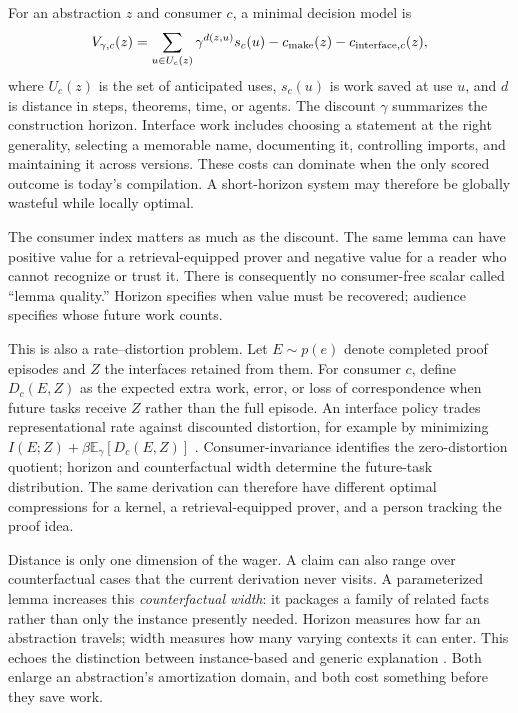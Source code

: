 \documentclass[10pt]{article}
\begin{document}
For an abstraction $z$ and consumer $c$, a minimal decision model is
\begin{equation}
 V_{\gamma,c}(z)=\sum_{u\in U_c(z)}\gamma^{d(z,u)}s_c(u)
 -c_{\rm make}(z)-c_{{\rm interface},c}(z),
 \label{eq:value}
\end{equation}
where $U_c(z)$ is the set of anticipated uses, $s_c(u)$ is work saved at use $u$, and $d$ is distance in
steps, theorems, time, or agents.  The discount $\gamma$ summarizes the construction horizon.
Interface work includes choosing a statement at the right generality, selecting a memorable name,
documenting it, controlling imports, and maintaining it across versions.  These costs can dominate
when the only scored outcome is today's compilation.  A short-horizon system may therefore be
globally wasteful while locally optimal.

The consumer index matters as much as the discount.  The same lemma can have positive value for a
retrieval-equipped prover and negative value for a reader who cannot recognize or trust it.  There
is consequently no consumer-free scalar called ``lemma quality.''  Horizon specifies when value
must be recovered; audience specifies whose future work counts.

This is also a rate--distortion problem.  Let $E\sim p(e)$ denote completed proof episodes and $Z$ the
interfaces retained from them.  For consumer $c$, define $D_c(E,Z)$ as the expected extra work,
error, or loss of correspondence when future tasks receive $Z$ rather than the full episode.  An
interface policy trades representational rate against discounted distortion, for example by
minimizing $I(E;Z)+\beta\mathbb{E}_{\gamma}[D_c(E,Z)]$ \citep{shannon1959}.  Consumer-invariance
identifies the zero-distortion quotient; horizon and counterfactual width determine the future-task
distribution.  The same derivation can therefore have different optimal compressions for a kernel,
a retrieval-equipped prover, and a person tracking the proof idea.

Distance is only one dimension of the wager.  A claim can also range over counterfactual cases that
the current derivation never visits.  A parameterized lemma increases this \emph{counterfactual
width}: it packages a family of related facts rather than only the instance presently needed.
Horizon measures how far an abstraction travels; width measures how many varying contexts it can
enter.  This echoes the distinction between instance-based and generic explanation
\citep{linnebo2022}.  Both enlarge an abstraction's amortization domain, and both cost something
before they save work.
\end{document}
